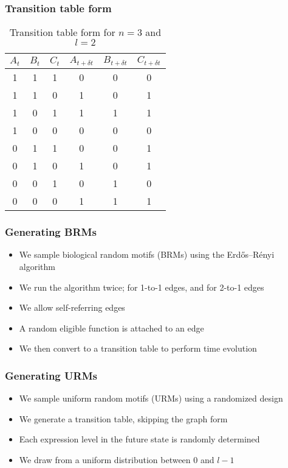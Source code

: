 \documentclass[hyperref={pdfpagelabels=false}]{beamer}
\begin{document}
\begin{frame}
\frametitle{Transition table form}
\begin{table}[ht]
\begin{center}
\begin{tabular}{|c|c|c||c|c|c|}
\hline
$A_t$ & $B_t$ & $C_t$ & $A_{t+\delta t}$ & $B_{t+\delta t}$ & $C_{t+\delta t}$ \\
\hline
\hline
1 & 1 & 1 & 0 & 0 & 0 \\
1 & 1 & 0 & 1 & 0 & 1 \\
1 & 0 & 1 & 1 & 1 & 1 \\
1 & 0 & 0 & 0 & 0 & 0 \\
0 & 1 & 1 & 0 & 0 & 1 \\
0 & 1 & 0 & 1 & 0 & 1 \\
0 & 0 & 1 & 0 & 1 & 0 \\
0 & 0 & 0 & 1 & 1 & 1 \\
\hline
\end{tabular}
\end{center}
\caption{Transition table form for $n=3$ and $l=2$}
\end{table}
\end{frame}

\begin{frame}
\frametitle{Generating BRMs}
\begin{itemize}
\item We sample biological random motifs (BRMs) using the Erdős–Rényi algorithm \cite{margolin2006aracne}
\item We run the algorithm twice; for 1-to-1 edges, and for 2-to-1 edges
\item We allow self-referring edges
\item A random eligible function is attached to an edge
\item We then convert to a transition table to perform time evolution
\end{itemize}
\end{frame}

\begin{frame}
\frametitle{Generating URMs}
\begin{itemize}
\item We sample uniform random motifs (URMs) using a randomized design
\item We generate a transition table, skipping the graph form
\item Each expression level in the future state is randomly determined
\item We draw from a uniform distribution between $0$ and $l-1$
\end{itemize}
\end{frame}
\end{document}
